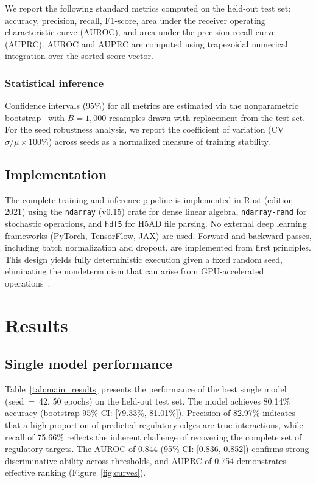 \documentclass[10pt,twocolumn]{article}
\begin{document}
We report the following standard metrics computed on the held-out test set: accuracy, precision, recall, F1-score, area under the receiver operating characteristic curve (AUROC), and area under the precision-recall curve (AUPRC).
AUROC and AUPRC are computed using trapezoidal numerical integration over the sorted score vector.

\subsubsection{Statistical inference}

Confidence intervals (95\%) for all metrics are estimated via the nonparametric bootstrap~\cite{efron1993introduction} with $B = 1{,}000$ resamples drawn with replacement from the test set.
For the seed robustness analysis, we report the coefficient of variation (CV = $\sigma / \mu \times 100\%$) across seeds as a normalized measure of training stability.

\subsection{Implementation}
\label{sec:implementation}

The complete training and inference pipeline is implemented in Rust (edition 2021) using the \texttt{ndarray} (v0.15) crate for dense linear algebra, \texttt{ndarray-rand} for stochastic operations, and \texttt{hdf5} for H5AD file parsing.
No external deep learning frameworks (PyTorch, TensorFlow, JAX) are used.
Forward and backward passes, including batch normalization and dropout, are implemented from first principles.
This design yields fully deterministic execution given a fixed random seed, eliminating the nondeterminism that can arise from GPU-accelerated operations~\cite{nagarajan2019deterministic}.

\section{Results}
\label{sec:results}

\subsection{Single model performance}
\label{sec:single}

Table~\ref{tab:main_results} presents the performance of the best single model (seed~=~42, 50 epochs) on the held-out test set.
The model achieves 80.14\% accuracy (bootstrap 95\% CI: [79.33\%, 81.01\%]).
Precision of 82.97\% indicates that a high proportion of predicted regulatory edges are true interactions, while recall of 75.66\% reflects the inherent challenge of recovering the complete set of regulatory targets.
The AUROC of 0.844 (95\% CI: [0.836, 0.852]) confirms strong discriminative ability across thresholds, and AUPRC of 0.754 demonstrates effective ranking (Figure~\ref{fig:curves}).
\end{document}
